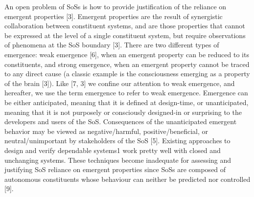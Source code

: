  An open problem of SoSs is how to provide justification of the reliance on emergent properties [3]. Emergent
properties are the result of synergistic collaboration between constituent systems, and are those properties
that cannot be expressed at the level of a single constituent system, but require observations of phenomena at the
SoS boundary [3]. There are two different types of emergence: weak emergence [6], when an emergent property
can be reduced to its constituents, and strong emergence, when an emergent property cannot be traced to any
direct cause (a classic example is the consciousness emerging as a property of the brain [3]). Like [7, 3] we
confine our attention to weak emergence, and hereafter, we use the term emergence to refer to weak emergence.
Emergence can be either anticipated, meaning that it is defined at design-time, or unanticipated, meaning
that it is not purposely or consciously designed-in or surprising to the developers and users of the SoS. Consequences
of the unanticipated emergent behavior may be viewed as negative/harmful, positive/beneficial, or
neutral/unimportant by stakeholders of the SoS [5]. Existing approaches to design and verify dependable systems1
work pretty well with closed and unchanging systems. These techniques become inadequate for assessing
and justifying SoS reliance on emergent properties since SoSs are composed of autonomous constituents
whose behaviour can neither be predicted nor controlled [9].

